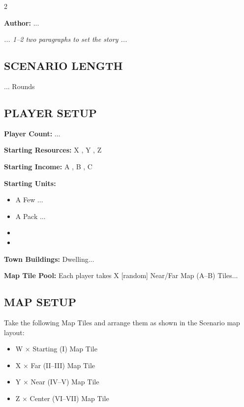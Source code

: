 
\begin{multicols*}{2}

\textbf{Author:} ...

\textit{... 1--2 two paragraphs to set the story ...}

\subsection*{\MakeUppercase{Scenario Length}}

... Rounds

\subsection*{\MakeUppercase{Player Setup}}

\textbf{Player Count:} ...

\textbf{Starting Resources:} X , Y , Z 

\textbf{Starting Income:} A , B , C 

\textbf{Starting Units:}
\begin{itemize}
  \item A Few ...
  \item A Pack ...
  \item {}
  \item {}
\end{itemize}

\textbf{Town Buildings:}  Dwelling...

\textbf{Map Tile Pool:} Each player takes X [random] Near/Far Map (A--B) Tiles...

\subsection*{\MakeUppercase{Map Setup}}

Take the following Map Tiles and arrange them as shown in the Scenario map layout:
\begin{itemize}
  \item W × Starting (I) Map Tile
  \item X × Far (II--III) Map Tile
  \item Y × Near (IV--V) Map Tile
  \item Z × Center (VI--VII) Map Tile
\end{itemize}


\end{multicols*}

